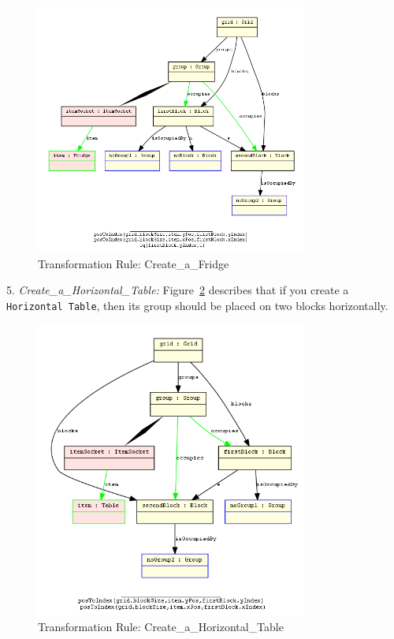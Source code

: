 \begin{figure}[h]
	\centering
	\includegraphics[width=0.8\textwidth]{figures/TR_Create_a_Fridge}
	\caption{Transformation Rule: Create\_a\_Fridge}
	\label{fig:TR_Create_a_Fridge}
\end{figure}

5. \textit{Create\_a\_Horizontal\_Table: } Figure~\ref{fig:TR_Create_a_Horizontal_Table} describes that if you create a \texttt{Horizontal Table}, then its group should be placed on two blocks horizontally.

\begin{figure}[h]
	\centering
	\includegraphics[width=0.8\textwidth]{figures/TR_Create_a_Horizontal_Table}
	\caption{Transformation Rule: Create\_a\_Horizontal\_Table}
	\label{fig:TR_Create_a_Horizontal_Table}
\end{figure}

